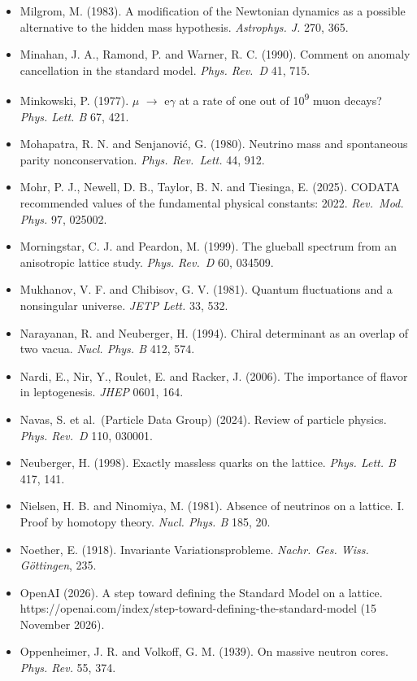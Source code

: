 \documentclass[
  11pt,
]{article}
\begin{document}
\begin{itemize}
\item
  Milgrom, M. (1983). A modification of the Newtonian dynamics as a possible alternative to the hidden mass hypothesis. \emph{Astrophys. J.} 270, 365.
\item
  Minahan, J. A., Ramond, P. and Warner, R. C. (1990). Comment on anomaly cancellation in the standard model. \emph{Phys. Rev.~D} 41, 715.
\item
  Minkowski, P. (1977). \ensuremath{\mu} \ensuremath{\to} e\ensuremath{\gamma} at a rate of one out of 10\textsuperscript{9} muon decays? \emph{Phys. Lett. B} 67, 421.
\item
  Mohapatra, R. N. and Senjanović, G. (1980). Neutrino mass and spontaneous parity nonconservation. \emph{Phys. Rev.~Lett.} 44, 912.
\item
  Mohr, P. J., Newell, D. B., Taylor, B. N. and Tiesinga, E. (2025). CODATA recommended values of the fundamental physical constants: 2022. \emph{Rev.~Mod. Phys.} 97, 025002.
\item
  Morningstar, C. J. and Peardon, M. (1999). The glueball spectrum from an anisotropic lattice study. \emph{Phys. Rev.~D} 60, 034509.
\item
  Mukhanov, V. F. and Chibisov, G. V. (1981). Quantum fluctuations and a nonsingular universe. \emph{JETP Lett.} 33, 532.
\item
  Narayanan, R. and Neuberger, H. (1994). Chiral determinant as an overlap of two vacua. \emph{Nucl. Phys. B} 412, 574.
\item
  Nardi, E., Nir, Y., Roulet, E. and Racker, J. (2006). The importance of flavor in leptogenesis. \emph{JHEP} 0601, 164.
\item
  Navas, S. et al.~(Particle Data Group) (2024). Review of particle physics. \emph{Phys. Rev.~D} 110, 030001.
\item
  Neuberger, H. (1998). Exactly massless quarks on the lattice. \emph{Phys. Lett. B} 417, 141.
\item
  Nielsen, H. B. and Ninomiya, M. (1981). Absence of neutrinos on a lattice. I. Proof by homotopy theory. \emph{Nucl. Phys. B} 185, 20.
\item
  Noether, E. (1918). Invariante Variationsprobleme. \emph{Nachr. Ges. Wiss. Göttingen}, 235.
\item
  OpenAI (2026). A step toward defining the Standard Model on a lattice. https://openai.com/index/step-toward-defining-the-standard-model (15 November 2026).
\item
  Oppenheimer, J. R. and Volkoff, G. M. (1939). On massive neutron cores. \emph{Phys. Rev.} 55, 374.

\end{itemize}
\end{document}
